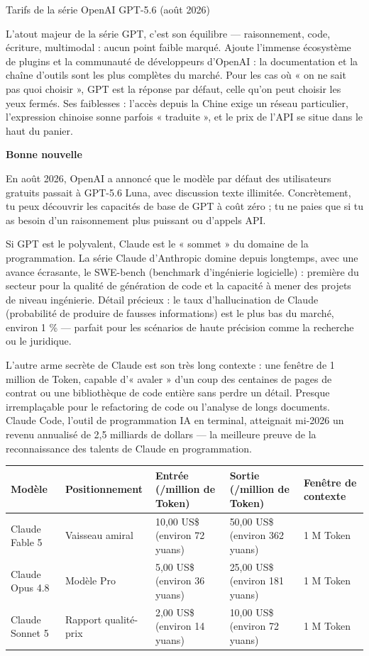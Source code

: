 \begin{center}\small\color{gray}Tarifs de la série OpenAI GPT-5.6 (août 2026)\end{center}

L'atout majeur de la série GPT, c'est son équilibre — raisonnement, code, écriture, multimodal : aucun point faible marqué. Ajoute l'immense écosystème de plugins et la communauté de développeurs d'OpenAI : la documentation et la chaîne d'outils sont les plus complètes du marché. Pour les cas où « on ne sait pas quoi choisir », GPT est la réponse par défaut, celle qu'on peut choisir les yeux fermés. Ses faiblesses : l'accès depuis la Chine exige un réseau particulier, l'expression chinoise sonne parfois « traduite », et le prix de l'API se situe dans le haut du panier.

\textbf{Bonne nouvelle}\par

En août 2026, OpenAI a annoncé que le modèle par défaut des utilisateurs gratuits passait à GPT-5.6 Luna, avec discussion texte illimitée. Concrètement, tu peux découvrir les capacités de base de GPT à coût zéro ; tu ne paies que si tu as besoin d'un raisonnement plus puissant ou d'appels API.


Si GPT est le polyvalent, Claude est le « sommet » du domaine de la programmation. La série Claude d'Anthropic domine depuis longtemps, avec une avance écrasante, le SWE-bench (benchmark d'ingénierie logicielle) : première du secteur pour la qualité de génération de code et la capacité à mener des projets de niveau ingénierie. Détail précieux : le taux d'hallucination de Claude (probabilité de produire de fausses informations) est le plus bas du marché, environ 1 \% — parfait pour les scénarios de haute précision comme la recherche ou le juridique.

L'autre arme secrète de Claude est son très long contexte : une fenêtre de 1 million de Token, capable d'« avaler » d'un coup des centaines de pages de contrat ou une bibliothèque de code entière sans perdre un détail. Presque irremplaçable pour le refactoring de code ou l'analyse de longs documents. Claude Code, l'outil de programmation IA en terminal, atteignait mi-2026 un revenu annualisé de 2,5 milliards de dollars — la meilleure preuve de la reconnaissance des talents de Claude en programmation.

\begin{center}
\begin{tabularx}{\linewidth}{|X|X|X|X|X|}
\hline
\textbf{Modèle} & \textbf{Positionnement} & \textbf{Entrée (/million de Token)} & \textbf{Sortie (/million de Token)} & \textbf{Fenêtre de contexte} \tabularnewline
\hline
Claude Fable 5 & Vaisseau amiral & 10,00 US\$ (environ 72 yuans) & 50,00 US\$ (environ 362 yuans) & 1 M Token \tabularnewline
Claude Opus 4.8 & Modèle Pro & 5,00 US\$ (environ 36 yuans) & 25,00 US\$ (environ 181 yuans) & 1 M Token \tabularnewline
Claude Sonnet 5 & Rapport qualité-prix & 2,00 US\$ (environ 14 yuans) & 10,00 US\$ (environ 72 yuans) & 1 M Token \tabularnewline
\hline
\end{tabularx}
\end{center}

